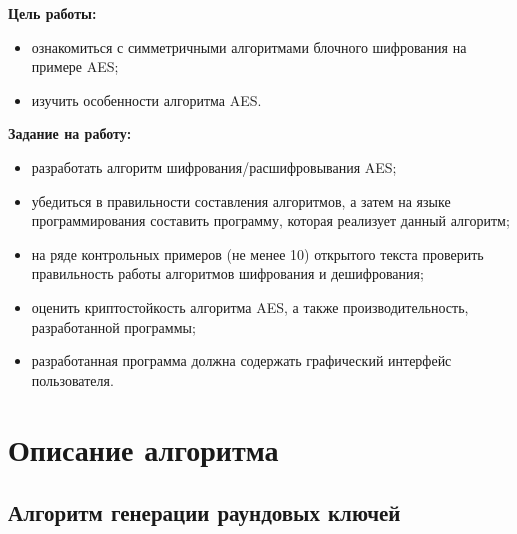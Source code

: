 \documentclass[utf8x, 14pt, bold, times]{G7-32} %
\begin{document}
\frontmatter %



\maketitle

\newpage
\tableofcontents
{}

\nobreakingbeforechapters

\newpage
\Introduction

\textbf{Цель работы:}
\begin{itemize}
\item ознакомиться с симметричными алгоритмами блочного шифрования на
      примере AES;
\item изучить особенности алгоритма AES.
\end{itemize}

\textbf{Задание на работу:}
\begin{itemize}
\item разработать алгоритм шифрования/расшифровывания AES;
\item убедиться в правильности составления алгоритмов, а затем на языке
      программирования составить программу, которая реализует данный алгоритм;
\item на ряде контрольных примеров (не менее 10) открытого текста проверить
      правильность работы алгоритмов шифрования и дешифрования;
\item оценить криптостойкость алгоритма AES, а также производительность,
      разработанной программы;
\item разработанная программа должна содержать графический интерфейс пользователя.
\end{itemize}

\mainmatter %
\newpage

\chapter{Описание алгоритма}

\section{Алгоритм генерации раундовых ключей}
\end{document}
